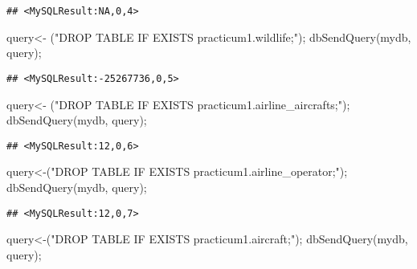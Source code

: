 \documentclass[
]{article}
\newenvironment{Shaded}{\begin{snugshade}}{\end{snugshade}}
\newcommand{\FunctionTok}[1]{\textcolor[rgb]{0.00,0.00,0.00}{#1}}
\newcommand{\NormalTok}[1]{#1}
\newcommand{\OtherTok}[1]{\textcolor[rgb]{0.56,0.35,0.01}{#1}}
\newcommand{\StringTok}[1]{\textcolor[rgb]{0.31,0.60,0.02}{#1}}
\begin{document}
\begin{verbatim}
## <MySQLResult:NA,0,4>
\end{verbatim}

\begin{Shaded}
\begin{Highlighting}[]
\NormalTok{query}\OtherTok{\textless{}{-}}\NormalTok{ (}\StringTok{"DROP TABLE IF EXISTS practicum1.\textasciigrave{}wildlife\textasciigrave{};"}\NormalTok{);}
\FunctionTok{dbSendQuery}\NormalTok{(mydb, query);}
\end{Highlighting}
\end{Shaded}

\begin{verbatim}
## <MySQLResult:-25267736,0,5>
\end{verbatim}

\begin{Shaded}
\begin{Highlighting}[]
\NormalTok{query}\OtherTok{\textless{}{-}}\NormalTok{ (}\StringTok{"DROP TABLE IF EXISTS practicum1.\textasciigrave{}airline\_aircrafts\textasciigrave{};"}\NormalTok{);}
\FunctionTok{dbSendQuery}\NormalTok{(mydb, query);}
\end{Highlighting}
\end{Shaded}

\begin{verbatim}
## <MySQLResult:12,0,6>
\end{verbatim}

\begin{Shaded}
\begin{Highlighting}[]
\NormalTok{query}\OtherTok{\textless{}{-}}\NormalTok{(}\StringTok{"DROP TABLE IF EXISTS practicum1.\textasciigrave{}airline\_operator\textasciigrave{};"}\NormalTok{);}
\FunctionTok{dbSendQuery}\NormalTok{(mydb, query);}
\end{Highlighting}
\end{Shaded}

\begin{verbatim}
## <MySQLResult:12,0,7>
\end{verbatim}

\begin{Shaded}
\begin{Highlighting}[]
\NormalTok{query}\OtherTok{\textless{}{-}}\NormalTok{(}\StringTok{"DROP TABLE IF EXISTS practicum1.\textasciigrave{}aircraft\textasciigrave{};"}\NormalTok{);}
\FunctionTok{dbSendQuery}\NormalTok{(mydb, query);}
\end{Highlighting}
\end{Shaded}
\end{document}
